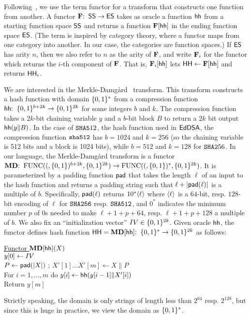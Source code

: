  Following~\cite{EC:BelDavGun20}, we use the term functor for a transform that constructs one function from another. A functor $\mathbf{F}{:\;\;}\mathsf{SS}\to\mathsf{ES}$ takes as oracle a function $\mathsf{hh}$ from a starting function space $\mathsf{SS}$ and returns a function $\mathbf{F}[\mathsf{hh}]$ in the ending function space $\mathsf{ES}$. (The term is inspired by category theory, where a functor maps from one category into another. In our case, the categories are function spaces.) If $\mathsf{ES}$ has arity $n$, then we also refer to $n$ as the arity of $\mathbf{F}$, and write $\mathbf{F}_i$ for the functor which returns the $i$-th component of $\mathbf{F}$. That is, $\mathbf{F}_i[\mathsf{hh}]$ lets $\mathsf{HH}\gets\mathbf{F}[\mathsf{hh}]$ and returns $\mathsf{HH}_i$.


 We are interested in the Merkle-Damg{\aa}rd~\cite{C:Merkle89a,C:Damgaard89b} transform. This transform constructs a hash function with domain $\{0,1\}^*$ from a compression function $\mathsf{hh}{:\;\;}\{0,1\}^{b+2k}\to\{0,1\}^{2k}$ for some integers $b$ and $k$. The compression function takes a $2k$-bit chaining variable $y$ and a $b$-bit block $B$ to return a $2k$ bit output $\mathsf{hh}(y\|B)$. In the case of $\texttt{SHA{5}}12$, the hash function used in $\mathsf{EdDSA}$, the compression function $\mathtt{sha{512}}$ has $b=1024$ and  $k=256$ (so the chaining variable is 512 bits and a block is 1024 bits), while $b= 512$ and $k=128$ for $\texttt{SHA{2}}56$. In our language, the Merkle-Damg{\aa}rd transform is a functor $\mathbf{MD}{:\;\;} \allowbreak \mathrm{FUNC}((,\{0,1\})^{b+2k},\allowbreak \{0,1\}^{2k}) \allowbreak  \to \allowbreak  \mathrm{FUNC}((,\{0,1\})^{*}, \allowbreak  \{0,1\}^{2k})$. It is parameterized by a padding function $\mathsf{pad}$ that takes the length $\ell$ of an input to the hash function and returns a padding string such that $\ell + |\mathsf{pad}(\ell)|$ is a multiple of $b$.
Specifically, $\mathsf{pad}(\ell)$ returns $10^*\langle \ell\rangle$ where $\langle \ell\rangle$ is a $64$-bit, resp. $128$-bit encoding of $\ell$ for $\texttt{SHA256}$ resp. $\texttt{SHA512}$, and $0^*$ indicates the minimum number $p$ of $0$s needed to make $\ell+ 1 + p + 64$, resp. $\ell + 1 + p + 128$ a multiple of $b$. We also fix an ``initialization vector'' $IV \in \{0,1\}^{2k}$. Given oracle $\mathsf{hh}$, the functor defines hash function $\mathsf{HH} = \mathbf{MD}[\mathsf{hh}]{:\;\;}\{0,1\}^{*}\to\{0,1\}^{2k}$ as follows:
\begin{tabbing}
\underline{Functor $\mathbf{MD}[\mathsf{hh}](X)$} \\[2pt]
$y[0] \gets IV$ \\
$P\gets \mathsf{pad}(|X|)$ ; $X'[1]\ldots X'[m] \gets X\|P$  \\
For $i=1,\ldots,m$ do $y[i] \gets \mathsf{hh}(y[i-1]\|X'[i])$ \\
Return $y[m]$
\label{MD}
\end{tabbing}
Strictly speaking, the domain is only strings of length less than $2^{64}$ resp. $2^{128}$, but since this is huge in practice, we view the domain as $\{0,1\}^*$. 

